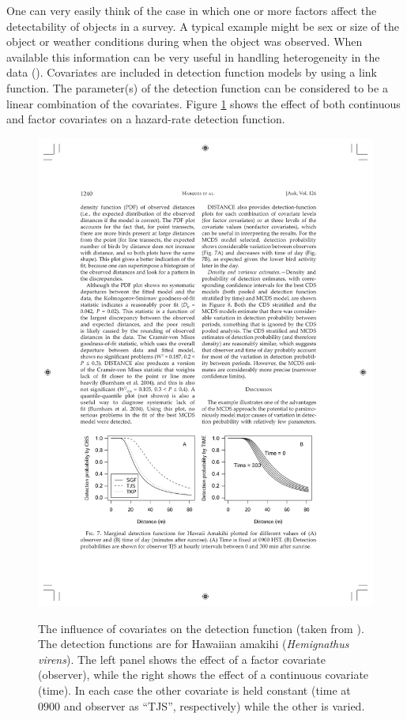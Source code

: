 One can very easily think of the case in which one or more factors affect the detectability of objects in a survey. A typical example might be sex or size of the object or weather conditions during when the object was observed. When available this information can be very useful in handling heterogeneity in the data (\cite[p. 88]{IDS}). Covariates are included in detection function models by using a link function. The parameter(s) of the detection function can be considered to be a linear combination of the covariates. Figure \ref{ds-covarex} shows the effect of both continuous and factor covariates on a hazard-rate detection function.

\begin{figure}
\centering
\includegraphics{intro/figs/amakihi-detfct.pdf}\\
\caption{The influence of covariates on the detection function (taken from \cite{amakihi}). The detection functions are for Hawaiian amakihi (\textit{Hemignathus virens}). The left panel shows the effect of a factor covariate (observer), while the right shows the effect of a continuous covariate (time). In each case the other covariate is held constant (time at $0900$ and observer as ``TJS'', respectively) while the other is varied.}
\label{ds-covarex}
\end{figure}

